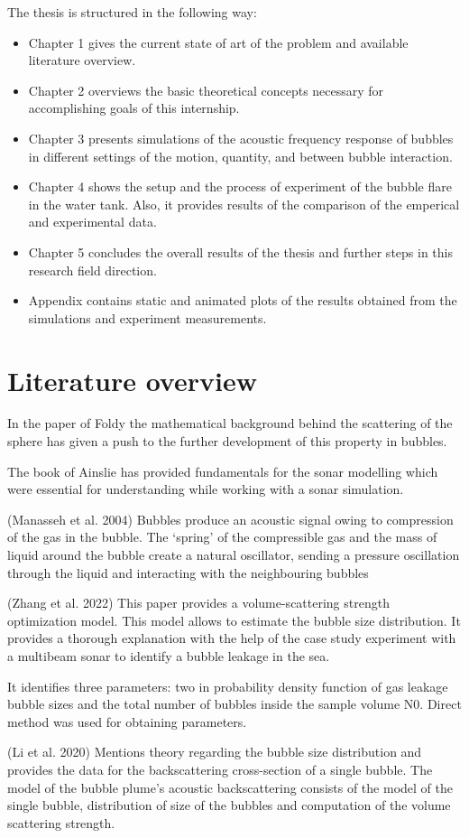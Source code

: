 The thesis is structured in the following way:
\begin{itemize}
    \item Chapter 1 gives the current state of art of the problem and available literature overview.
    \item Chapter 2 overviews the basic theoretical concepts necessary for accomplishing goals of this internship.
    \item Chapter 3 presents simulations of the acoustic frequency response of bubbles in different settings of the motion, quantity, and between bubble interaction. 
    \item Chapter 4 shows the setup and the process of experiment of the bubble flare in the water tank. Also, it provides results of the comparison of the emperical and experimental data.
    \item Chapter 5 concludes the overall results of the thesis and further steps in this research field direction.
    \item Appendix contains static and animated plots of the results obtained from the simulations and experiment measurements.  
\end{itemize}

\section{Literature overview} 

In the paper of Foldy the mathematical background behind the scattering of the sphere has given a push to the further development of this property in bubbles.

The book of Ainslie has provided fundamentals for the sonar modelling which were essential for understanding while working with a sonar simulation. 

(Manasseh et al. 2004\cite{manasseh_anisotropy_2004}) Bubbles produce an acoustic signal owing to compression of the gas in the bubble. The ‘spring’ of the compressible gas and the mass of liquid around the bubble create a natural oscillator, sending a pressure oscillation through the liquid and interacting with the neighbouring bubbles

(Zhang et al. 2022\cite{zhang_efficient_2022}) This paper provides a volume-scattering strength optimization model. This model allows to estimate the bubble size distribution. It provides a thorough explanation with the help of the case study experiment with a multibeam sonar to identify a bubble leakage in the sea.

It identifies three parameters: two in probability density function of gas leakage bubble sizes and the total number of bubbles inside the sample volume N0. Direct method was used for obtaining parameters.

(Li et al. 2020\cite{li_broadband_2020}) Mentions theory regarding the bubble size distribution and provides the data for the backscattering cross-section of a single bubble. The model of the bubble plume’s acoustic backscattering consists of the model of the single bubble, distribution of size of the bubbles and computation of the volume scattering strength.

